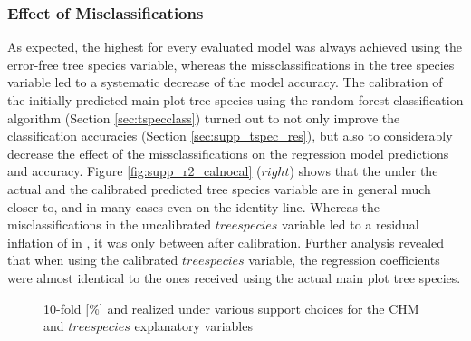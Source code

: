\subsubsection*{Effect of Misclassifications}

 As expected, the highest \adjrsq{} for every evaluated model was always achieved using the error-free tree species variable, whereas the missclassifications in the tree species variable led to a systematic decrease of the model accuracy. The calibration of the initially predicted main plot tree species using the random forest classification algorithm (Section \ref{sec:tspecclass}) turned out to not only improve the classification accuracies (Section \ref{sec:supp_tspec_res}), but also to considerably decrease the effect of the missclassifications on the regression model predictions and accuracy. Figure \ref{fig:supp_r2_calnocal} ($right$) shows that the \adjrsq{} under the actual and the calibrated predicted tree species variable are in general much closer to, and in many cases even on the identity line.  Whereas the misclassifications in the uncalibrated $treespecies$ variable led to a residual inflation of  in \adjrsq{}, it was only between  after calibration. Further analysis revealed that when using the calibrated $treespecies$ variable, the regression coefficients were almost identical to the ones received using the actual main plot tree species.

\begin{figure}[h]
	\centering
	\caption{10-fold \rmsecv{}[\%] and \adjrsq{} realized under various support choices for the CHM and $tree species$ explanatory variables}
	\label{fig:supp_perf_res}
\end{figure}


